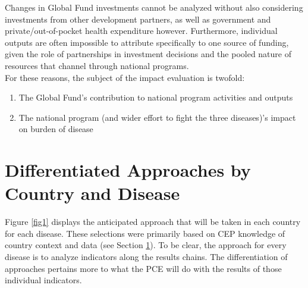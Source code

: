 \documentclass[twocolumn]{bmcart}%
\begin{document}
Changes in Global Fund investments cannot be analyzed without also considering investments from other development partners, as well as government and private/out-of-pocket health expenditure however. Furthermore, individual outputs are often impossible to attribute specifically to one source of funding, given the role of partnerships in investment decisions and the pooled nature of resources that channel through national programs. \\

For these reasons, the subject of the impact evaluation is twofold:
\begin{enumerate}
  \item The Global Fund's contribution to national program activities and outputs
  \item The national program (and wider effort to fight the three diseases)'s impact on burden of disease
\end{enumerate}

\section{Differentiated Approaches by Country and Disease} \label{why}

Figure \ref{fig1} displays the anticipated approach that will be taken in each country for each disease. These selections were primarily based on CEP knowledge of country context and data (see Section \ref{why}). To be clear, the approach for every disease is to analyze indicators along the results chains. The differentiation of approaches pertains more to what the PCE will do with the results of those individual indicators. \\
\end{document}

